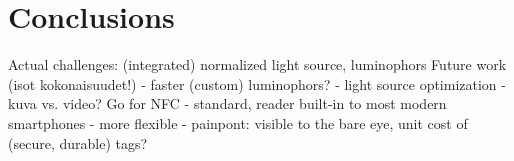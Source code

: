 \documentclass[thesis.tex]{subfiles}
\begin{document}
\chapter{Conclusions}
\label{chapter:conclusions}

Actual challenges: (integrated) normalized light source, luminophors
Future work (isot kokonaisuudet!)
  - faster (custom) luminophors?
  - light source optimization
  - kuva vs. video?
Go for NFC
- standard, reader built-in to most modern smartphones
- more flexible
- painpont: visible to the bare eye, unit cost of (secure, durable) tags?
\end{document}
